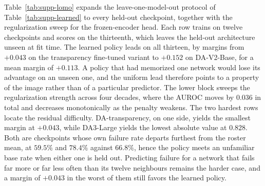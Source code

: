 \documentclass{article} %
\theoremstyle{defstyle}
\theoremstyle{plain}
\begin{document}
Table~\ref{tab:supp-lomo} expands the leave-one-model-out protocol of
Table~\ref{tab:supp-learned} to every held-out checkpoint, together with the regularization
sweep for the frozen-encoder head. Each row trains on twelve checkpoints and scores on the
thirteenth, which leaves the held-out architecture unseen at fit time. The learned policy leads
on all thirteen, by margins from $+0.043$ on the transparency fine-tuned variant to $+0.152$ on
DA-V2-Base, for a mean margin of $+0.113$. A policy that had memorized one network would lose
its advantage on an unseen one, and the uniform lead therefore points to a property of the
image rather than of a particular predictor. The lower block sweeps the regularization strength
across four decades, where the AUROC moves by $0.036$ in total and decreases monotonically as
the penalty weakens. The two hardest rows locate the residual difficulty. DA-transparency, on
one side, yields the smallest margin at $+0.043$, while DA3-Large yields the lowest absolute
value at $0.828$. Both are checkpoints whose own failure rate departs furthest from the roster
mean, at $59.5\%$ and $78.4\%$ against $66.8\%$, hence the policy meets an unfamiliar base rate
when either one is held out. Predicting failure for a network that fails far more or far less
often than its twelve neighbours remains the harder case, and a margin of $+0.043$ in the worst
of them still favors the learned policy.
\end{document}
